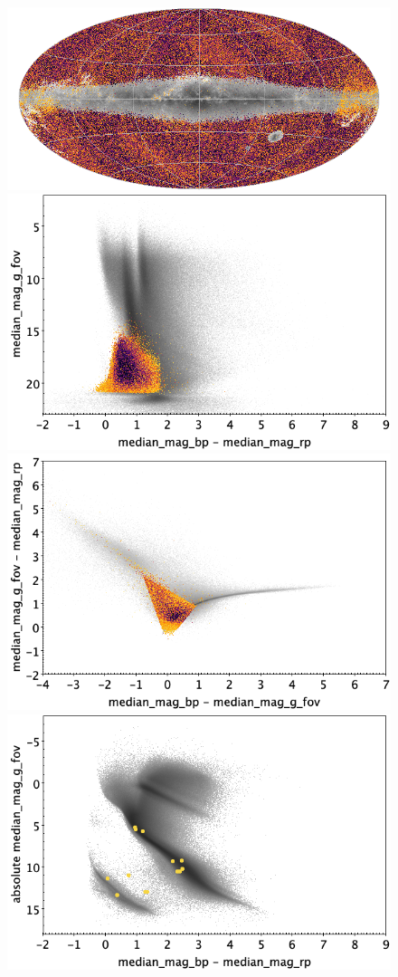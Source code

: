 \documentclass[longauth]{aa}
\begin{document}
\begin{appendix}
\begin{figure}
\centering
{}
\includegraphics[width=0.6\hsize]{figures/appendix/AGN_cls_sky.png} 
 \\ %
\vspace{4mm}
 \includegraphics[width=0.45\hsize]{figures/appendix/AGN_cls_cm.png}  %
\hspace{2mm}
 \includegraphics[width=0.45\hsize]{figures/appendix/AGN_cls_cc.png} \\ %
\vspace{4mm}
 \includegraphics[width=0.45\hsize]{figures/appendix/AGN_cls_cam.png}  %

\end{figure}
\end{appendix}
\end{document}
